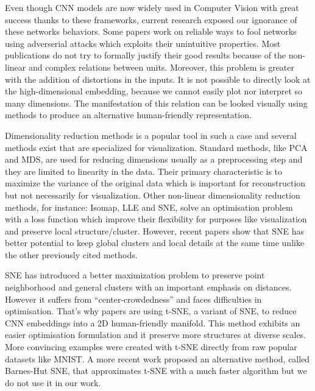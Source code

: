 \documentclass[a4paper,12pt]{report}
\begin{document}
Even though CNN models are now widely used in Computer Vision with great success thanks to these frameworks, current research exposed our ignorance of these networks behaviors.
Some papers work on reliable ways to fool networks using adverserial attacks which exploits their unintuitive properties\cite{szegedy2013intriguing}.
Most publications do not try to formally justify their good results because of the non-linear and complex relations between units. %
Moreover, this problem is greater with the addition of distortions in the inputs.
It is not possible to directly look at the high-dimensional embedding, because we cannot easily plot nor interpret so many dimensions.
The manifestation of this relation can be looked visually using methods to produce an alternative human-friendly representation.

Dimensionality reduction methods is a popular tool in such a case\cite{dai2014document}\cite{taylor2011learning} and several methods exist that are specialized for visualization.
Standard methods, like PCA and MDS\cite{cox2000multidimensional}, are used for reducing dimensions usually as a preprocessing step and they are limited to linearity in the data.
Their primary characteristic is to maximize the variance of the original data which is important for reconstruction but not necessarily for visualization.
Other non-linear dimensionality reduction methods, for instance: Isomap\cite{tenenbaum2000global}, LLE\cite{roweis2000nonlinear} and SNE\cite{SNE}, solve an optimisation problem with a loss function which improve their flexibility for purposes like visualization and preserve local structure/cluster.
However, recent papers show that SNE has better potential to keep global clusters and local details at the same time unlike the other previously cited methods\cite{SNE}.

SNE has introduced a better maximization problem to preserve point neighborhood and general clusters with an important emphasis on distances\cite{SNE}.
However it suffers from ``center-crowdedness'' and faces difficulties in optimisation\cite{t-SNE}.
That's why papers are using t-SNE, a variant of SNE, to reduce CNN embeddings into a 2D human-friendly manifold. %
This method exhibits an easier optimisation formulation and it preserve more structures at diverse scales.
More convincing examples were created with t-SNE directly from raw popular datasets\cite{van2009new} like MNIST\cite{t-SNE}.
A more recent work proposed an alternative method, called Barnes-Hut SNE, that approximates t-SNE with a much faster algorithm but we do not use it in our work.
\end{document}

